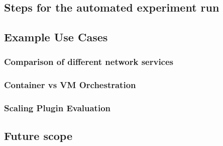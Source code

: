 \subsection{Steps for the automated experiment run} 

\subsection{Example Use Cases}

\subsubsection{Comparison of different network services} 
\subsubsection{Container vs VM Orchestration} 
\subsubsection{Scaling Plugin Evaluation}

\subsection{Future scope}
